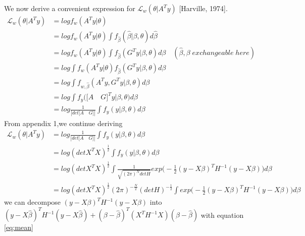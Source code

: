 \documentclass[a4paper,11pt]{article}
\begin{document}
We now derive a convenient expression for ${\mathcal{L}}_w(\theta| A^T y)$ [Harville, 1974].
\begin{equation}\label{eq:2} 
  \begin{split}
         {\mathcal{L}}_w (\theta| A^T y) &= log f_w (A^T y | \theta) \\
                                        &= log f_w (A^T y | \theta) \int f_{\widehat{\beta}}(\widehat{\beta} | \beta , \theta) d\widehat{\beta} \\
                                        &= log f_w (A^T y | \theta) \int f_{\widehat{\beta}}(G^T y | \beta , \theta) d\beta \quad  (\widehat{\beta},\beta\; exchangeable\; here)\\
                                        &= log \int f_w(A^T y | \theta)f_{\widehat{\beta}}(G^T y | \beta , \theta) d\beta \\
                                        &= log \int f_{w,\widehat{\beta}}(A^T y, G^T y | \beta , \theta) d\beta \\
                                        &= log \int f_y \bigg(\bigg[A\quad G\bigg]^T y |\beta,\theta\bigg)d\beta \\
                                        &= log \frac{1}{|det\bigg[A\quad G\bigg]|} \int f_y (y|\beta,\theta)d\beta
  \end{split}
\end{equation}
From appendix 1,we continue deriving
\begin{equation}\label{eq:2} 
  \begin{split}
         {\mathcal{L}}_w (\theta| A^T y) &= log \frac{1}{|det\bigg[A\quad G\bigg]|} \int f_y (y|\beta,\theta)d\beta \\
                                        &= log (det X^T X)^\frac{1}{2} \int f_y (y|\beta,\theta)d\beta \\
                                        &= log (det X^T X)^\frac{1}{2} \int \frac{1}{\sqrt{(2\pi)^N det H}} exp \bigg(-\frac{1}{2}(y - X\beta)^T H^{-1} (y - X\beta)\bigg)d\beta\\
                                        &= log (det X^T X)^\frac{1}{2} (2\pi)^{-\frac{N}{2}}(det H)^{-\frac{1}{2}} \int exp \bigg(-\frac{1}{2}(y - X\beta)^T H^{-1} (y - X\beta)\bigg)d\beta
  \end{split}
\end{equation}
we can decompose $(y - X\beta)^T H^{-1} (y - X\beta)$ into $(y - X\widehat{\beta})^T H^{-1} (y - X\widehat{\beta}) + (\beta - \widehat{\beta} )^T(X^T H^{-1} X)(\beta - \widehat{\beta})$ with equation \eqref{eq:mean}
\end{document}
